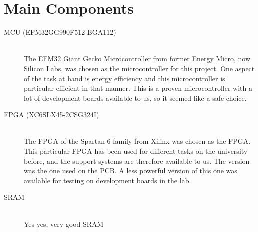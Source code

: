 \section{Main Components}


\begin{description}

    \item[MCU (EFM32GG990F512-BGA112)] \hfill \\
    The EFM32 Giant Gecko Microcontroller from former Energy Micro, now Silicon Labs, was chosen as the microcontroller for this project.
    One aspect of the task at hand is energy efficiency and this microcontroller is particular efficient in that manner.
    This is a proven microcontroller with a lot of development boards available to us, so it seemed like a safe choice.

    \item[FPGA (XC6SLX45-2CSG324I)] \hfill \\
    The  FPGA of the Spartan-6 family from Xilinx was chosen as the FPGA.
    This particular FPGA has been used for different tasks on the university before, and the support systems are therefore available to us.
    The version was the one used on the PCB.
    A less powerful version of this one was available for testing on development boards in the lab.


    \item[SRAM] \hfill \\
    Yes yes, very good SRAM 

\end{description}
